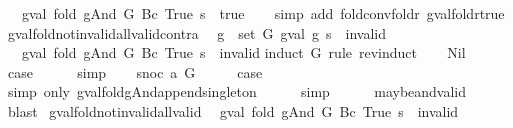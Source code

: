 \begin{isabellebody}
\ \ \ gval\ {\isacharparenleft}fold\ gAnd\ G\ {\isacharparenleft}Bc\ True{\isacharparenright}{\isacharparenright}\ s\ {\isacharequal}\ true{\isachardoublequoteclose}\isanewline
%
\isadelimproof
\ \ %
\endisadelimproof
%
\isatagproof
{}\isamarkupfalse%
\ {\isacharparenleft}simp\ add{\isacharcolon}\ fold{\isacharunderscore}conv{\isacharunderscore}foldr\ gval{\isacharunderscore}foldr{\isacharunderscore}true{\isacharparenright}%
\endisatagproof
{\isafoldproof}%
%
\isadelimproof
\isanewline
%
\endisadelimproof
\isanewline
{}\isamarkupfalse%
\ gval{\isacharunderscore}fold{\isacharunderscore}not{\isacharunderscore}invalid{\isacharunderscore}all{\isacharunderscore}valid{\isacharunderscore}contra{\isacharcolon}\isanewline
\ \ {\isachardoublequoteopen}{\isasymexists}g\ {\isasymin}\ set\ G{\isachardot}\ gval\ g\ s\ {\isacharequal}\ invalid\ {\isasymLongrightarrow}\isanewline
\ \ \ gval\ {\isacharparenleft}fold\ gAnd\ G\ {\isacharparenleft}Bc\ True{\isacharparenright}{\isacharparenright}\ s\ {\isacharequal}\ invalid{\isachardoublequoteclose}\isanewline
%
\isadelimproof
%
\endisadelimproof
%
\isatagproof
{}\isamarkupfalse%
{\isacharparenleft}induct\ G\ rule{\isacharcolon}\ rev{\isacharunderscore}induct{\isacharparenright}\isanewline
\ \ \isamarkupfalse%
\ Nil\isanewline
\ \ \isamarkupfalse%
\ \isamarkupfalse%
\ {\isacharquery}case\isanewline
\ \ \ \ \isamarkupfalse%
\ simp\isanewline
{}\isamarkupfalse%
\isanewline
\ \ \isamarkupfalse%
\ {\isacharparenleft}snoc\ a\ G{\isacharparenright}\isanewline
\ \ \isamarkupfalse%
\ \isamarkupfalse%
\ {\isacharquery}case\isanewline
\ \ \ \ \isamarkupfalse%
\ {\isacharparenleft}simp\ only{\isacharcolon}\ gval{\isacharunderscore}fold{\isacharunderscore}gAnd{\isacharunderscore}append{\isacharunderscore}singleton{\isacharparenright}\isanewline
\ \ \ \ \isamarkupfalse%
\ simp\isanewline
\ \ \ \ \isamarkupfalse%
\ maybe{\isacharunderscore}and{\isacharunderscore}valid\ \isamarkupfalse%
\ blast\isanewline
{}\isamarkupfalse%
%
\endisatagproof
{\isafoldproof}%
%
\isadelimproof
\isanewline
%
\endisadelimproof
\isanewline
{}\isamarkupfalse%
\ gval{\isacharunderscore}fold{\isacharunderscore}not{\isacharunderscore}invalid{\isacharunderscore}all{\isacharunderscore}valid{\isacharcolon}\isanewline
\ \ {\isachardoublequoteopen}gval\ {\isacharparenleft}fold\ gAnd\ G\ {\isacharparenleft}Bc\ True{\isacharparenright}{\isacharparenright}\ s\ {\isasymnoteq}\ invalid\ {\isasymLongrightarrow}\isanewline

\end{isabellebody}
